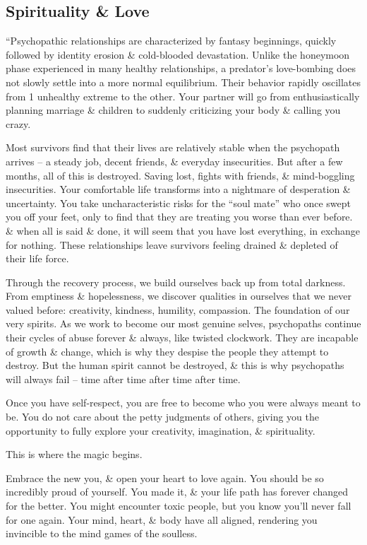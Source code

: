 \documentclass{article}
\numberwithin{equation}{section}
\begin{document}
\subsection{Spirituality \& Love}
``Psychopathic relationships are characterized by fantasy beginnings, quickly followed by identity erosion \& cold-blooded devastation. Unlike the honeymoon phase experienced in many healthy relationships, a predator's love-bombing does not slowly settle into a more normal equilibrium. Their behavior rapidly oscillates from 1 unhealthy extreme to the other. Your partner will go from enthusiastically planning marriage \& children to suddenly criticizing your body \& calling you crazy.

Most survivors find that their lives are relatively stable when the psychopath arrives -- a steady job, decent friends, \& everyday insecurities. But after a few months, all of this is destroyed. Saving lost, fights with friends, \& mind-boggling insecurities. Your comfortable life transforms into a nightmare of desperation \& uncertainty. You take uncharacteristic risks for the ``soul mate'' who once swept you off your feet, only to find that they are treating you worse than ever before. \& when all is said \& done, it will seem that you have lost everything, in exchange for nothing. These relationships leave survivors feeling drained \& depleted of their life force.

Through the recovery process, we build ourselves back up from total darkness. From emptiness \& hopelessness, we discover qualities in ourselves that we never valued before: creativity, kindness, humility, compassion. The foundation of our very spirits. As we work to become our most genuine selves, psychopaths continue their cycles of abuse forever \& always, like twisted clockwork. They are incapable of growth \& change, which is why they despise the people they attempt to destroy. But the human spirit cannot be destroyed, \& this is why psychopaths will always fail -- time after time after time after time.

Once you have self-respect, you are free to become who you were always meant to be. You do not care about the petty judgments of others, giving you the opportunity to fully explore your creativity, imagination, \& spirituality.

This is where the magic begins.

Embrace the new you, \& open your heart to love again. You should be so incredibly proud of yourself. You made it, \& your life path has forever changed for the better. You might encounter toxic people, but you know you'll never fall for one again. Your mind, heart, \& body have all aligned, rendering you invincible to the mind games of the soulless.
\end{document}
